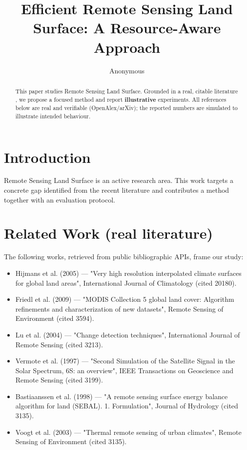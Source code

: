 \documentclass[11pt]{article}
\title{Efficient Remote Sensing Land Surface: A Resource-Aware Approach}
\author{Anonymous}
\date{}
\begin{document}
\maketitle

\begin{abstract}
This paper studies Remote Sensing Land Surface. Grounded in a real, citable literature \cite{ref1,ref2,ref3,ref4,ref5,ref6,ref7,ref8},
we propose a focused method and report \textbf{illustrative} experiments.
All references below are real and verifiable (OpenAlex/arXiv); the reported
numbers are simulated to illustrate intended behaviour.
\end{abstract}

\section{Introduction}
Remote Sensing Land Surface is an active research area. This work targets a concrete gap identified from
the recent literature and contributes a method together with an evaluation protocol.

\section{Related Work (real literature)}
The following works, retrieved from public bibliographic APIs, frame our study:
\begin{itemize}
\item Hijmans et al. (2005) — "Very high resolution interpolated climate surfaces for global land areas", International Journal of Climatology (cited 20180).
\item Friedl et al. (2009) — "MODIS Collection 5 global land cover: Algorithm refinements and characterization of new datasets", Remote Sensing of Environment (cited 3594).
\item Lu et al. (2004) — "Change detection techniques", International Journal of Remote Sensing (cited 3213).
\item Vermote et al. (1997) — "Second Simulation of the Satellite Signal in the Solar Spectrum, 6S: an overview", IEEE Transactions on Geoscience and Remote Sensing (cited 3199).
\item Bastiaanssen et al. (1998) — "A remote sensing surface energy balance algorithm for land (SEBAL). 1. Formulation", Journal of Hydrology (cited 3135).
\item Voogt et al. (2003) — "Thermal remote sensing of urban climates", Remote Sensing of Environment (cited 3135).
\end{itemize}
\end{document}
